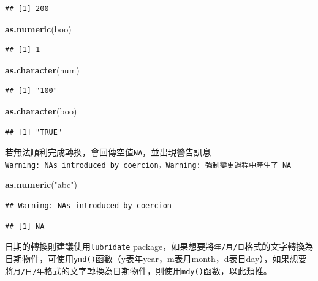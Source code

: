 \documentclass[]{book}
\newenvironment{Shaded}{\begin{snugshade}}{\end{snugshade}}
\newcommand{\KeywordTok}[1]{\textcolor[rgb]{0.13,0.29,0.53}{\textbf{{#1}}}}
\newcommand{\StringTok}[1]{\textcolor[rgb]{0.31,0.60,0.02}{{#1}}}
\newcommand{\NormalTok}[1]{{#1}}
\theoremstyle{definition}
\theoremstyle{definition}
\theoremstyle{remark}
\begin{document}
\begin{verbatim}
## [1] 200
\end{verbatim}

\begin{Shaded}
\begin{Highlighting}[]
\KeywordTok{as.numeric}\NormalTok{(boo)}
\end{Highlighting}
\end{Shaded}

\begin{verbatim}
## [1] 1
\end{verbatim}

\begin{Shaded}
\begin{Highlighting}[]
\KeywordTok{as.character}\NormalTok{(num)}
\end{Highlighting}
\end{Shaded}

\begin{verbatim}
## [1] "100"
\end{verbatim}

\begin{Shaded}
\begin{Highlighting}[]
\KeywordTok{as.character}\NormalTok{(boo)}
\end{Highlighting}
\end{Shaded}

\begin{verbatim}
## [1] "TRUE"
\end{verbatim}

若無法順利完成轉換，會回傳空值\texttt{NA}，並出現警告訊息\texttt{Warning:\ NAs\ introduced\ by\ coercion，Warning:\ 強制變更過程中產生了\ NA}

\begin{Shaded}
\begin{Highlighting}[]
\KeywordTok{as.numeric}\NormalTok{(}\StringTok{"abc"}\NormalTok{)}
\end{Highlighting}
\end{Shaded}

\begin{verbatim}
## Warning: NAs introduced by coercion
\end{verbatim}

\begin{verbatim}
## [1] NA
\end{verbatim}

日期的轉換則建議使用\texttt{lubridate}\citep{R-lubridate}
package，如果想要將\texttt{年/月/日}格式的文字轉換為日期物件，可使用\texttt{ymd()}函數（y表年year，m表月month，d表日day），如果想要將\texttt{月/日/年}格式的文字轉換為日期物件，則使用\texttt{mdy()}函數，以此類推。
\end{document}
